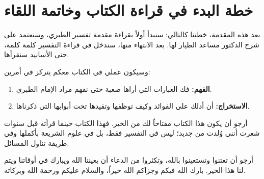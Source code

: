 \section{خطة البدء في قراءة الكتاب وخاتمة اللقاء}
بعد هذه المقدمة، خطتنا كالتالي: سنبدأ أولاً بقراءة مقدمة تفسير الطبري، وسنعتمد على شرح الدكتور مساعد الطيار لها. بعد الانتهاء منها، سندخل في قراءة التفسير كلمة كلمة، حتى الأسانيد سنقرأها. 

وسيكون عملي في الكتاب معكم يتركز في أمرين:
\begin{enumerate}
    \item \textbf{الفهم:} فك العبارات التي أراها صعبة حتى نفهم مراد الإمام الطبري.
    \item \textbf{الاستخراج:} أن أدلك على الفوائد وكيف توظفها وتقيدها تحت أبوابها التي ذكرناها.
\end{enumerate}

أرجو أن يكون هذا الكتاب مفتاحاً لك من الخير. فهذا الكتاب حينما قرأته قبل سنوات شعرت أنني وُلدت من جديد؛ ليس في التفسير فقط، بل في علوم الشريعة بأكملها وفي طريقة تناول المسائل. 

أرجو أن تعتنوا وتستعينوا بالله، وتكثروا من الدعاء أن يعيننا الله ويبارك في أوقاتنا ويتم لنا هذا الخير. بارك الله فيكم وجزاكم الله خيراً، والسلام عليكم ورحمة الله وبركاته.
